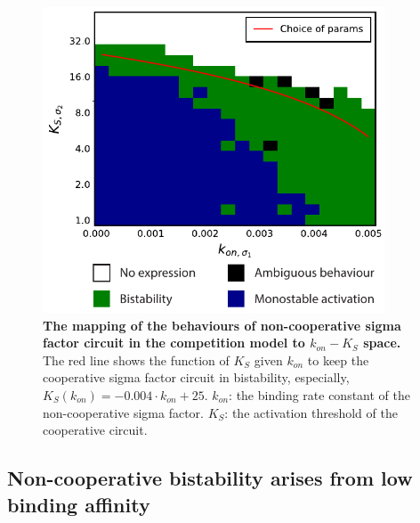 \begin{figure}[ht]
    \centering
    \includegraphics[width = 4in]{k1_KS_mapping.pdf}
    \caption[
        The mapping of the behaviours of non-cooperative sigma 
        factor circuit in the competition model to $k_{on}-K_S$ space
        ]{
        \textbf{The mapping of the behaviours of non-cooperative sigma 
        factor circuit in the competition model to $k_{on}-K_S$ space.}
        The red line shows the function of $K_S$ given $k_{on}$ to keep
        the cooperative sigma factor circuit in bistability, especially,
        $K_S(k_{on}) = -0.004 \cdot k_{on} + 25$.
        $k_{on}$: the binding rate constant of the non-cooperative sigma
        factor. $K_S$: the activation threshold of the cooperative circuit.
    }
    \label{fig:k1_KS_mapping}
\end{figure}

\clearpage
\subsection{Non-cooperative bistability arises from low binding affinity}
\label{sec:both_non_coop_bistability}

